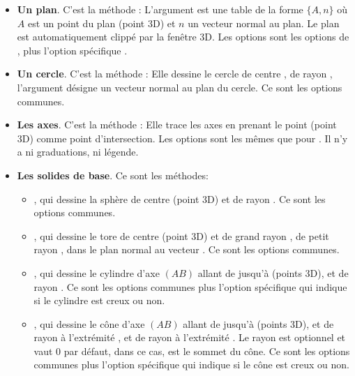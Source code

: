 \begin{itemize}
    \item \textbf{Un plan}. C'est la méthode : 
    L'argument  est une table de la forme $\{A,n\}$ où $A$ est un point du plan  (point 3D) et $n$ un vecteur normal au plan. Le plan est automatiquement clippé par la fenêtre 3D. Les options sont les options de , plus l'option spécifique .
    
    \item \textbf{Un cercle}. C'est la méthode : 
    Elle dessine le cercle de centre , de rayon , l'argument  désigne un vecteur normal au plan du cercle. Ce sont les options communes.
    
     \item \textbf{Les axes}. C'est la méthode : 
    Elle trace les axes en prenant le point  (point 3D) comme point d'intersection. Les options sont les mêmes que pour . Il n'y a ni graduations, ni légende.
    
    \item \textbf{Les solides de base}. Ce sont les méthodes:
        \begin{itemize}
            \item {}, qui dessine la sphère de centre   (point 3D) et de rayon . Ce sont les options communes.

            \item {}, qui dessine le tore de centre  (point 3D) et de grand rayon , de petit rayon , dans le plan normal au vecteur . Ce sont les options communes.
            
            \item {}, qui dessine le cylindre d'axe $(AB)$ allant de  jusqu'à  (points 3D), et de rayon . Ce sont les options communes plus l'option spécifique  qui indique si le cylindre est creux ou non.

            \item {}, qui dessine le cône d'axe $(AB)$ allant de  jusqu'à  (points 3D), et de rayon  à l'extrémité , et de rayon  à l'extrémité . Le rayon  est optionnel et vaut $0$ par défaut, dans ce cas,  est le sommet du cône. Ce sont les options communes plus l'option spécifique  qui indique si le cône est creux ou non.
            

\end{itemize}
\end{itemize}
